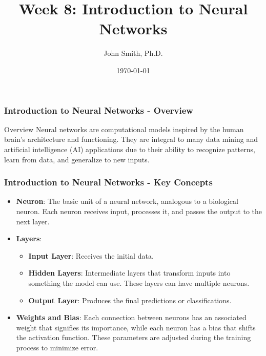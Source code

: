 \documentclass[aspectratio=169]{beamer}
\title[Week 8: Introduction to Neural Networks]{Week 8: Introduction to Neural Networks}
\author[J. Smith]{John Smith, Ph.D.}
\institute[University Name]{
  Department of Computer Science\\
  University Name\\
  \vspace{0.3cm}
  Email: email@university.edu\\
  Website: www.university.edu
}
\date{\today}
\begin{document}
\frame{\titlepage}

\begin{frame}[fragile]
    \frametitle{Introduction to Neural Networks - Overview}
    \begin{block}{Overview}
        Neural networks are computational models inspired by the human brain's architecture and functioning.
        They are integral to many data mining and artificial intelligence (AI) applications due to their ability to recognize patterns, learn from data, and generalize to new inputs.
    \end{block}
\end{frame}

\begin{frame}[fragile]
    \frametitle{Introduction to Neural Networks - Key Concepts}
    \begin{itemize}
        \item \textbf{Neuron}: The basic unit of a neural network, analogous to a biological neuron. Each neuron receives input, processes it, and passes the output to the next layer.
        
        \item \textbf{Layers}: 
        \begin{itemize}
            \item \textbf{Input Layer}: Receives the initial data.
            \item \textbf{Hidden Layers}: Intermediate layers that transform inputs into something the model can use. These layers can have multiple neurons.
            \item \textbf{Output Layer}: Produces the final predictions or classifications.
        \end{itemize}
        
        \item \textbf{Weights and Bias}: Each connection between neurons has an associated weight that signifies its importance, while each neuron has a bias that shifts the activation function. These parameters are adjusted during the training process to minimize error.
    \end{itemize}
\end{frame}
\end{document}
